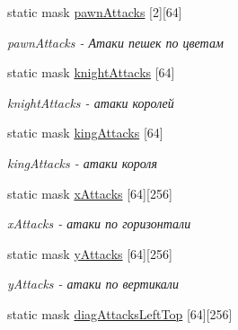 \begin{DoxyCompactItemize}
\item 
\hypertarget{classboard_a7335d4d9f22c5d32777fd4b419ed173d}{}static mask \hyperlink{classboard_a7335d4d9f22c5d32777fd4b419ed173d}{pawn\+Attacks} \mbox{[}2\mbox{]}\mbox{[}64\mbox{]}\label{classboard_a7335d4d9f22c5d32777fd4b419ed173d}

\begin{DoxyCompactList}\small\item\em pawn\+Attacks -\/ Атаки пешек по цветам \end{DoxyCompactList}\item 
\hypertarget{classboard_ac343023f9b20b07922cf5780be2bfe8b}{}static mask \hyperlink{classboard_ac343023f9b20b07922cf5780be2bfe8b}{knight\+Attacks} \mbox{[}64\mbox{]}\label{classboard_ac343023f9b20b07922cf5780be2bfe8b}

\begin{DoxyCompactList}\small\item\em knight\+Attacks -\/ атаки королей \end{DoxyCompactList}\item 
\hypertarget{classboard_aeebd1ae59c78f614db0337e4edb5b5d8}{}static mask \hyperlink{classboard_aeebd1ae59c78f614db0337e4edb5b5d8}{king\+Attacks} \mbox{[}64\mbox{]}\label{classboard_aeebd1ae59c78f614db0337e4edb5b5d8}

\begin{DoxyCompactList}\small\item\em king\+Attacks -\/ атаки короля \end{DoxyCompactList}\item 
\hypertarget{classboard_acaec3ff166bdb2ae166ac877394908e9}{}static mask \hyperlink{classboard_acaec3ff166bdb2ae166ac877394908e9}{x\+Attacks} \mbox{[}64\mbox{]}\mbox{[}256\mbox{]}\label{classboard_acaec3ff166bdb2ae166ac877394908e9}

\begin{DoxyCompactList}\small\item\em x\+Attacks -\/ атаки по горизонтали \end{DoxyCompactList}\item 
\hypertarget{classboard_a804587c2a72537dda9106895acbc6cf8}{}static mask \hyperlink{classboard_a804587c2a72537dda9106895acbc6cf8}{y\+Attacks} \mbox{[}64\mbox{]}\mbox{[}256\mbox{]}\label{classboard_a804587c2a72537dda9106895acbc6cf8}

\begin{DoxyCompactList}\small\item\em y\+Attacks -\/ атаки по вертикали \end{DoxyCompactList}\item 
\hypertarget{classboard_a60f3b256b2baa81086ba437001bd53d4}{}static mask \hyperlink{classboard_a60f3b256b2baa81086ba437001bd53d4}{diag\+Attacks\+Left\+Top} \mbox{[}64\mbox{]}\mbox{[}256\mbox{]}\label{classboard_a60f3b256b2baa81086ba437001bd53d4}


\end{DoxyCompactItemize}
